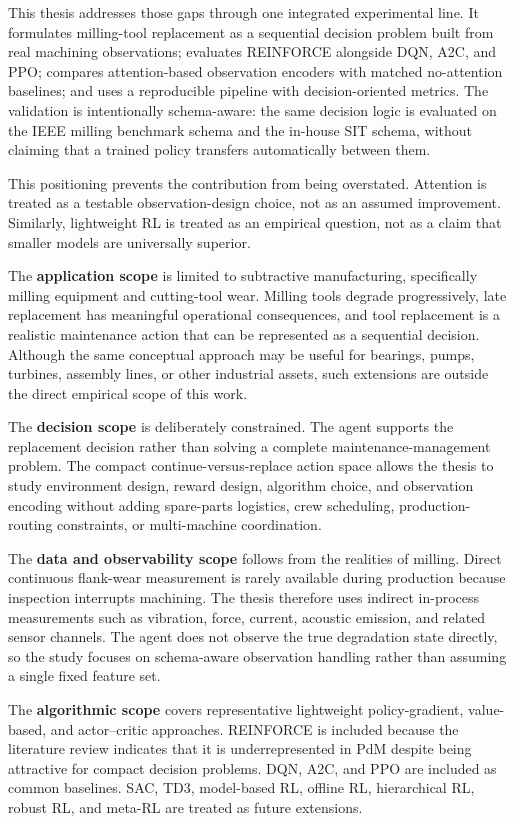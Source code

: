 \documentclass[12pt,oneside]{book}
\begin{document}
This thesis addresses those gaps through one integrated experimental line. It formulates milling-tool replacement as a sequential decision problem built from real machining observations; evaluates \textsc{REINFORCE} alongside DQN, A2C, and PPO; compares attention-based observation encoders with matched no-attention baselines; and uses a reproducible pipeline with decision-oriented metrics. The validation is intentionally schema-aware: the same decision logic is evaluated on the IEEE milling benchmark schema and the in-house SIT schema, without claiming that a trained policy transfers automatically between them.

This positioning prevents the contribution from being overstated. Attention is treated as a testable observation-design choice, not as an assumed improvement. Similarly, lightweight RL is treated as an empirical question, not as a claim that smaller models are universally superior.

The \textbf{application scope} is limited to subtractive manufacturing, specifically milling equipment and cutting-tool wear. Milling tools degrade progressively, late replacement has meaningful operational consequences, and tool replacement is a realistic maintenance action that can be represented as a sequential decision. Although the same conceptual approach may be useful for bearings, pumps, turbines, assembly lines, or other industrial assets, such extensions are outside the direct empirical scope of this work.

The \textbf{decision scope} is deliberately constrained. The agent supports the replacement decision rather than solving a complete maintenance-management problem. The compact continue-versus-replace action space allows the thesis to study environment design, reward design, algorithm choice, and observation encoding without adding spare-parts logistics, crew scheduling, production-routing constraints, or multi-machine coordination.

The \textbf{data and observability scope} follows from the realities of milling. Direct continuous flank-wear measurement is rarely available during production because inspection interrupts machining. The thesis therefore uses indirect in-process measurements such as vibration, force, current, acoustic emission, and related sensor channels. The agent does not observe the true degradation state directly, so the study focuses on schema-aware observation handling rather than assuming a single fixed feature set.

The \textbf{algorithmic scope} covers representative lightweight policy-gradient, value-based, and actor--critic approaches. \textsc{REINFORCE} is included because the literature review indicates that it is underrepresented in PdM despite being attractive for compact decision problems. DQN, A2C, and PPO are included as common baselines. SAC, TD3, model-based RL, offline RL, hierarchical RL, robust RL, and meta-RL are treated as future extensions.
\end{document}
